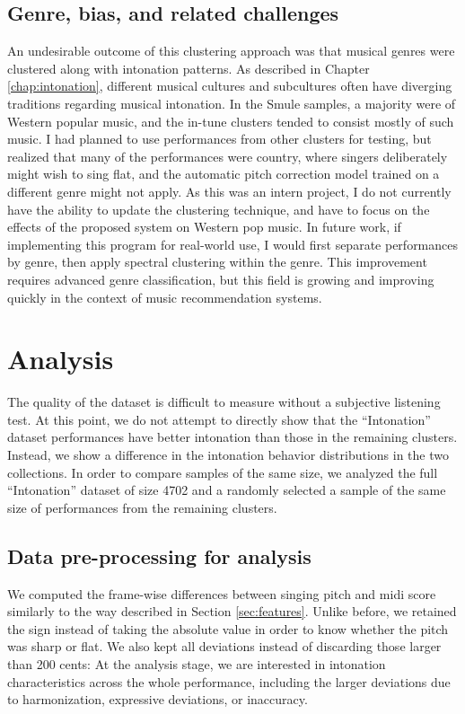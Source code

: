 \subsection{Genre, bias, and related challenges}
An undesirable outcome of this clustering approach was that musical genres were clustered along with intonation patterns. As described in Chapter \ref{chap:intonation}, different musical cultures and subcultures often have diverging traditions regarding musical intonation. In the Smule samples, a majority were of Western popular music, and the in-tune clusters tended to consist mostly of such music. I had planned to use performances from other clusters for testing, but realized that many of the performances were country, where singers deliberately might wish to sing flat, and the automatic pitch correction model trained on a different genre might not apply. As this was an intern project, I do not currently have the ability to update the clustering technique, and have to focus on the effects of the proposed system on Western pop music. In future work, if implementing this program for real-world use, I would first separate performances by genre, then apply spectral clustering within the genre. This improvement requires advanced genre classification, but this field is growing and improving quickly in the context of music recommendation systems.  

\section{Analysis}

The quality of the dataset is difficult to measure without a subjective listening test. At this point, we do not attempt to directly show that the ``Intonation'' dataset performances have better intonation than those in the remaining clusters. Instead, we show a difference in the intonation behavior distributions in the two collections. In order to compare samples of the same size, we analyzed the full ``Intonation'' dataset of size 4702 and a randomly selected a sample of the same size of performances from the remaining clusters.

\subsection{Data pre-processing for analysis}
We computed the frame-wise differences between singing pitch and \gls{midi} score similarly to the way described in Section \ref{sec:features}. Unlike before, we retained the sign instead of taking the absolute value in order to know whether the pitch was sharp or flat. We also kept all deviations instead of discarding those larger than 200 cents: At the analysis stage, we are interested in intonation characteristics across the whole performance, including the larger deviations due to harmonization, expressive deviations, or inaccuracy. 

